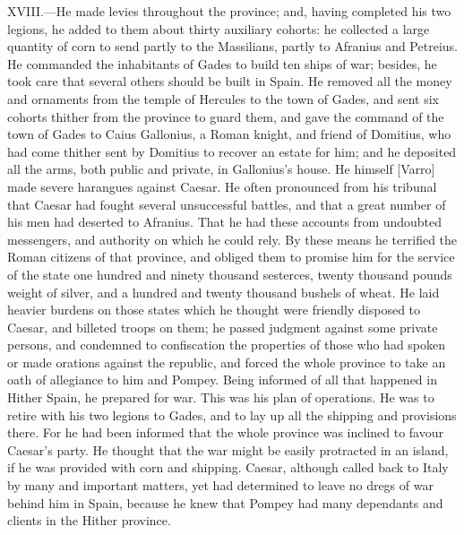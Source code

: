 XVIII.—He made levies throughout the province; and, having completed
his two legions, he added to them about thirty auxiliary cohorts: he
collected a large quantity of corn to send partly to the Massilians,
partly to Afranius and Petreius. He commanded the inhabitants of Gades
to build ten ships of war; besides, he took care that several others
should be built in Spain. He removed all the money and ornaments from
the temple of Hercules to the town of Gades, and sent six cohorts
thither from the province to guard them, and gave the command of the
town of Gades to Caius Gallonius, a Roman knight, and friend of
Domitius, who had come thither sent by Domitius to recover an estate for
him; and he deposited all the arms, both public and private, in
Gallonius's house. He himself [Varro] made severe harangues against
Caesar. He often pronounced from his tribunal that Caesar had fought
several unsuccessful battles, and that a great number of his men had
deserted to Afranius. That he had these accounts from undoubted
messengers, and authority on which he could rely. By these means he
terrified the Roman citizens of that province, and obliged them to
promise him for the service of the state one hundred and ninety thousand
sesterces, twenty thousand pounds weight of silver, and a hundred and
twenty thousand bushels of wheat. He laid heavier burdens on those
states which he thought were friendly disposed to Caesar, and billeted
troops on them; he passed judgment against some private persons, and
condemned to confiscation the properties of those who had spoken or made
orations against the republic, and forced the whole province to take an
oath of allegiance to him and Pompey. Being informed of all that
happened in Hither Spain, he prepared for war. This was his plan of
operations. He was to retire with his two legions to Gades, and to lay
up all the shipping and provisions there. For he had been informed that
the whole province was inclined to favour Caesar's party. He thought
that the war might be easily protracted in an island, if he was provided
with corn and shipping. Caesar, although called back to Italy by many
and important matters, yet had determined to leave no dregs of war
behind him in Spain, because he knew that Pompey had many dependants and
clients in the Hither province.

